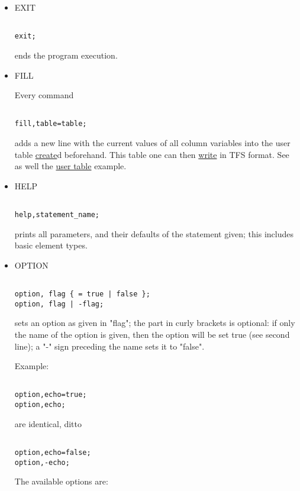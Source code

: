 \begin{itemize}
	\item EXIT
\begin{verbatim}

exit;
\end{verbatim} ends the program execution. 


	\item FILL 

	Every command 
\begin{verbatim}

fill,table=table;
\end{verbatim} adds a new line with the current values of all column variables into the user table \hyperlink{create}{create}d beforehand. This table one can then \hyperlink{write}{write} in TFS format.  See as well the \href{../Introduction/select.html#ucreate}{user table} example. 


	\item HELP
\begin{verbatim}

help,statement_name;
\end{verbatim} prints all parameters, and their defaults of the statement given; this includes basic element types. 


	\item OPTION
\begin{verbatim}

option, flag { = true | false };
option, flag | -flag;
\end{verbatim} sets an option as given in "flag"; the part in curly brackets is optional: if only the name of the option is given, then the option will be set true (see second line); a "-" sign preceding the name sets it to "false". 

 Example: 
\begin{verbatim}

option,echo=true;
option,echo;
\end{verbatim} are identical, ditto 
\begin{verbatim}

option,echo=false;
option,-echo;
\end{verbatim} The available options are: 
\begin{verbatim}


\end{verbatim}
\end{itemize}
